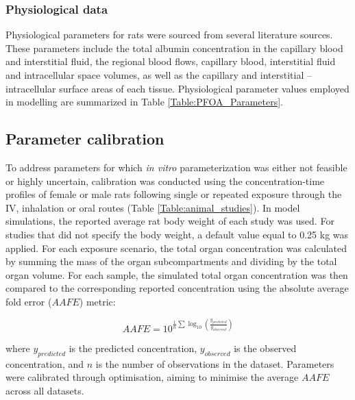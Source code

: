 \documentclass[preprint,12pt,authoryear]{elsarticle}
\begin{document}
\subsubsection{Physiological data}
Physiological parameters for rats were sourced from several literature sources. These parameters include the total albumin concentration in the capillary blood and interstitial fluid, the regional blood flows, capillary blood, interstitial fluid and intracellular space volumes, as well as the capillary and interstitial – intracellular surface areas of each tissue. Physiological parameter values employed in modelling are summarized in Table \ref{Table:PFOA_Parameters}. 

\subsection{Parameter calibration}
To address parameters for which \textit{in vitro} parameterization was either not feasible or highly uncertain, calibration was conducted using the concentration-time profiles of female or male rats following single or repeated exposure through the IV, inhalation or oral routes (Table \ref{Table:animal_studies}). In model simulations, the reported average rat body weight of each study was used. For studies that did not specify the body weight, a default value equal to 0.25 kg was applied. For each exposure scenario, the total organ concentration was calculated by summing the mass of the organ subcompartments and dividing by the total organ volume. For each sample, the simulated total organ concentration was then compared to the corresponding reported concentration  using the absolute average fold error ($AAFE$) metric: 

\begin{equation}
AAFE = 10^{\frac{1}{n}\sum  \log_{10} \left( \frac{y_{predicted}}{y_{observed}} \right)  }
\end{equation}

\noindent
where $y_{predicted}$ is the predicted concentration, $y_{observed}$ is the observed concentration, and $n$ is the number of observations in the dataset. Parameters were calibrated through optimisation, aiming to minimise the average $AAFE$ across all datasets.
\end{document}
